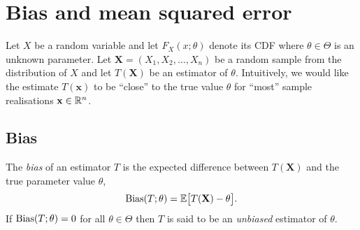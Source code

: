 
\section{Bias and mean squared error}\label{sec:}



Let $X$ be a random variable and let $F_X(x;\theta)$ denote its CDF where $\theta\in\Theta$ is an unknown parameter. Let $\mathbf{X}=(X_1,X_2,\ldots,X_n)$ be a random sample from the distribution of $X$ and let $T(\mathbf{X})$ be an estimator of $\theta$. Intuitively, we would like the estimate $T(\mathbf{x})$ to be ``close'' to the true value $\theta$ for ``most'' sample realisations $\mathbf{x}\in\mathbb{R}^n$.

\subsection{Bias}

\begin{definition}
The \emph{bias} of an estimator $T$ is the expected difference between $T(\mathbf{X})$ and the true parameter value $\theta$,
\[
\text{Bias}(T;\theta) = \mathbb{E}\big[T(\mathbf{X}) - \theta\big].
\]
If $\text{Bias}(T;\theta)=0$ for all $\theta\in\Theta$ then $T$ is said to be an \emph{unbiased} estimator of $\theta$.
\end{definition}

